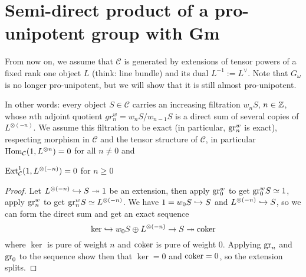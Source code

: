  
\section{Semi-direct product of a pro-unipotent group with Gm}

From now on, we assume that $\mathcal{C}$ is generated by extensions of tensor powers of a fixed rank one object $L$ (think: line bundle) and its dual $L^{-1} := L^\vee$.
Note that $G_\omega$ is no longer pro-unipotent, but we will show that it is still almost pro-unipotent.

 In other words: every object $S \in \mathcal{C}$ carries an increasing filtration $w_nS$, $n \in \mathbb{Z}$, whose $n$th adjoint quotient $gr^w_{n} = w_{n} S / w_{n-1} S$ is a direct sum of several copies of $L^{\otimes(-n)}$. We assume this filtration to be exact (in particular, $\mathrm{gr}^w_n$ is exact), respecting morphism in $\mathcal{C}$ and the tensor structure of $\mathcal{C}$, in particular $\mathrm{Hom}_{\mathcal{C}}(1,L^{\otimes n}) = 0$ for all $n \neq 0$ and

\begin{prop}
  $\mathrm{Ext}^1_{\mathcal{C}}(1,L^{\otimes (-n)}) = 0$ for $n \geq 0$ 
\end{prop}
\begin{proof}
Let $L^{\otimes (-n)} \hookrightarrow S \twoheadrightarrow 1$ be an extension,
then apply $\mathrm{gr}_0^w$ to get $\mathrm{gr}_0^w S \simeq 1$,
apply $\mathrm{gr}_n^w$ to get $\mathrm{gr}_n^w S \simeq L^{\otimes (-n)}$.
We have $1 = w_0 S \hookrightarrow S$ and $L^{\otimes (-n)} \hookrightarrow S$,
so we can form the direct sum and get an exact sequence
\[\ker \hookrightarrow w_0 S \oplus L^{\otimes (-n)} \to S \twoheadrightarrow \mathrm{coker}\]
where $\ker$ is pure of weight $n$ and $\mathrm{coker}$ is pure of weight $0$.
Applying $\mathrm{gr}_n$ and $\mathrm{gr}_0$ to the sequence show then that $\ker = 0$ and $\mathrm{coker} = 0$,
so the extension splits.
\end{proof}


